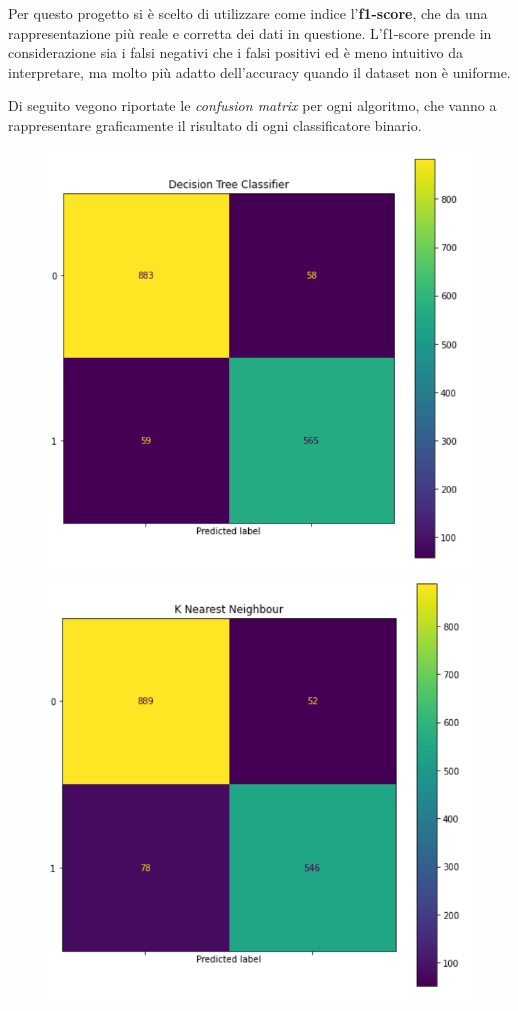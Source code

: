 \documentclass[12pt,a4paper]{article}
\begin{document}
Per questo progetto si è scelto di utilizzare come indice l'\textbf{f1-score}, che da una rappresentazione più reale e corretta dei dati in questione. L'f1-score prende in considerazione sia i falsi negativi che i falsi positivi ed è meno intuitivo da interpretare, ma molto più adatto dell'accuracy quando il dataset non è uniforme.

Di seguito vegono riportate le \textit{confusion matrix} per ogni algoritmo, che vanno a rappresentare graficamente il risultato di ogni classificatore binario.

\begin{figure}[th]
   \begin{minipage}{0.33\textwidth}
    \centering
     \includegraphics[width=.9\linewidth]{confusion_tree.png}
     \caption{}
   \end{minipage}\hfill
   \begin{minipage}{0.33\textwidth}
    \centering
     \includegraphics[width=.9\linewidth]{confusion_knn.png}

\end{minipage}
\end{figure}
\end{document}
